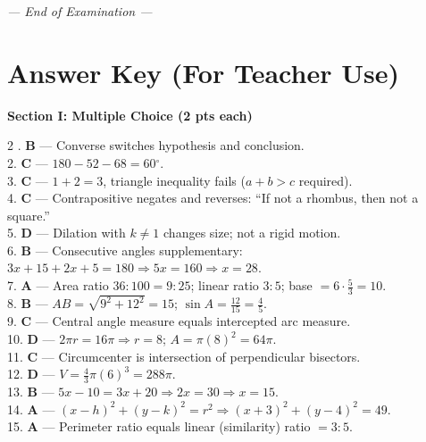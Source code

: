 \documentclass[12pt,addpoints]{exam}
\newcommand{\deg}{{}^\circ}
\begin{document}
\vfill
\begin{center}
\textit{--- End of Examination ---}
\end{center}

\newpage

\section*{Answer Key (For Teacher Use)}

\noindent\textbf{Section I: Multiple Choice (2 pts each)}
\begin{multicols}{2}
. \textbf{B} --- Converse switches hypothesis and conclusion.\\[4pt]
2. \textbf{C} --- $180 - 52 - 68 = 60\deg$.\\[4pt]
3. \textbf{C} --- $1 + 2 = 3$, triangle inequality fails ($a+b > c$ required).\\[4pt]
4. \textbf{C} --- Contrapositive negates and reverses: ``If not a rhombus, then not a square.''\\[4pt]
5. \textbf{D} --- Dilation with $k \neq 1$ changes size; not a rigid motion.\\[4pt]
6. \textbf{B} --- Consecutive angles supplementary: $3x+15 + 2x+5 = 180 \Rightarrow 5x = 160 \Rightarrow x = 28$.\\[4pt]
7. \textbf{A} --- Area ratio $36\!:\!100 = 9\!:\!25$; linear ratio $3\!:\!5$; base $= 6 \cdot \frac{5}{3} = 10$.\\[4pt]
8. \textbf{B} --- $AB = \sqrt{9^2+12^2} = 15$; $\sin A = \frac{12}{15} = \frac{4}{5}$.\\[4pt]
9. \textbf{C} --- Central angle measure equals intercepted arc measure.\\[4pt]
10. \textbf{D} --- $2\pi r = 16\pi \Rightarrow r = 8$; $A = \pi(8)^2 = 64\pi$.\\[4pt]
11. \textbf{C} --- Circumcenter is intersection of perpendicular bisectors.\\[4pt]
12. \textbf{D} --- $V = \frac{4}{3}\pi(6)^3 = 288\pi$.\\[4pt]
13. \textbf{B} --- $5x-10 = 3x+20 \Rightarrow 2x = 30 \Rightarrow x = 15$.\\[4pt]
14. \textbf{A} --- $(x-h)^2 + (y-k)^2 = r^2 \Rightarrow (x+3)^2 + (y-4)^2 = 49$.\\[4pt]
15. \textbf{A} --- Perimeter ratio equals linear (similarity) ratio $= 3:5$.
\end{multicols}
\end{document}
